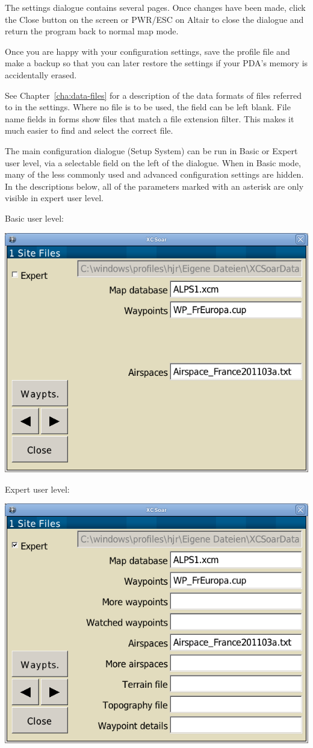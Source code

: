 The settings dialogue contains several pages.  Once changes have been made,
click the Close button on the screen or PWR/ESC on Altair to close the dialogue
and return the program back to normal map mode.

\tip Once you are happy with your configuration settings, save the
profile file and make a backup so that you can later restore the
settings if your PDA's memory is accidentally erased.

See Chapter~\ref{cha:data-files} for a description of the data formats
of files referred to in the settings.  Where no file is to be used,
the field can be left blank.  File name fields in forms show files
that match a file extension filter.  This makes it much easier to find
and select the correct file.

The main configuration dialogue (Setup System) can be run in Basic or
Expert user level, via a selectable field on the left of the dialogue.
When in Basic mode, many of the less commonly used and advanced
configuration settings are hidden.  In the descriptions below,
all of the parameters marked with an asterisk are only visible in
expert user level.

Basic user level:
\begin{center}
\includegraphics[angle=0,width=0.8\linewidth,keepaspectratio='true']{figures/config-basic.png}
\end{center}

Expert user level:
\begin{center}
\includegraphics[angle=0,width=0.8\linewidth,keepaspectratio='true']{figures/config-expert.png}
\end{center}

